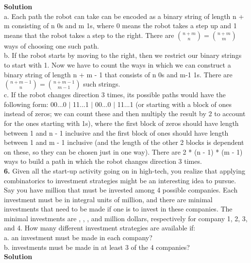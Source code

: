 \documentclass[10pt,a4paper,oneside,draft]{report}
\begin{document}
\newpage
\textbf{Solution} \\

a. Each path the robot can take can be encoded as a binary string of length n + m consisting of n 0s and m 1s, where 0 means the robot takes a step up and 1 means that the robot takes a step to the right.
There are ${n + m \choose n} = {n + m \choose m}$ ways of choosing one such path. \\

b. If the robot starts by moving to the right, then we restrict our binary strings to start with 1. Now we have to count the ways in which we can construct a binary string of length n + m - 1 that consists of n 0s and m-1 1s. There are $ {n + m - 1 \choose n} = {n + m - 1 \choose m - 1} $ such strings. \\

c. If the robot changes direction 3 times, its possible paths would have the following form: 00...0 $\vert$ 11...1 $\vert$ 00...0 $\vert$ 11...1 (or starting with a block of ones instead of zeros; we can count these and then multiply the result by 2 to account for the ones starting with 1s), where the first block of zeros should have length between 1 and n - 1 inclusive and the first block of ones should have length between 1 and m - 1 inclusive (and the length of the other 2 blocks is dependent on these, so they can be chosen just in one way). There are 2 * (n - 1) * (m - 1) ways to build a path in which the robot changes direction 3 times. \\

\textbf{6.} Given all the start-up activity going on in high-tech, you realize that applying combinatorics to investment strategies might be an interesting idea to pursue. Say you have  million
that must be invested among 4 possible companies. Each investment must be in integral
units of  million, and there are minimal investments that need to be made if one is to
invest in these companies. The minimal investments are , , , and  million dollars,
respectively for company 1, 2, 3, and 4. How many different investment strategies are available if: \\
a. an investment must be made in each company? \\
b. investments must be made in at least 3 of the 4 companies? \\

\textbf{Solution} \\
\end{document}
